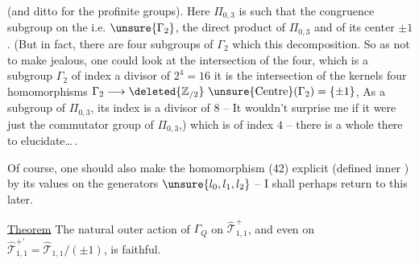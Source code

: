 (and ditto for the profinite groups). Here $\Pi_{0,3}$ is such that the congruence subgroup on the   \deleted{\unsure{$\Gamma$}} i.e. $\unsure{\Gamma_2}$,  the direct product of   $\Pi_{0,3}$ and of
its center $\pm1$. (But in fact, there are  four subgroups of $\Gamma_2$ which  this decomposition. So as not to make  jealous, one could look at the intersection of the four, which is a subgroup $\Gamma_2$ of index a divisor of $2^4=16$ it is the intersection of the kernels  four homomorphisms $\Gamma_2\longrightarrow\deleted{\mathbb Z_{/2}}\ \unsure{\mathrm{Centre}}(\Gamma_2)=\{\pm1\}$,
As a subgroup of $\Pi_{0,3}$, its index is a divisor of $8$ -- It wouldn't surprise me if it were just the commutator group of $\Pi_{0,3}$,) which is of index $4$ -- there is a whole  there to elucidate\ldots\,.

Of course, one should also make the homomorphism (42) explicit (defined  inner ) by its values on the generators $\unsure{l_0,l_1,l_2}$ -- I shall perhaps return to this later.


\uline{Theorem} The natural outer action of $\Gamma_Q$ on $\widehat{\mathcal T}_{1,1}^{+}$, and even on $\widehat{\mathcal T}_{1,1}^{+\prime}=\widehat{\mathcal T}_{1,1}/(\pm1)$, is faithful.

